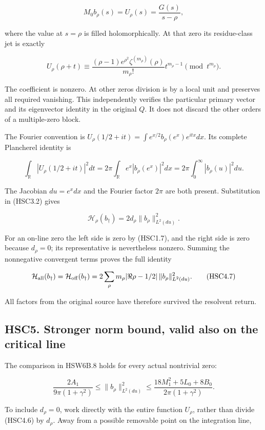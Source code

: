 \[
 M_0b_\rho(s)=U_\rho(s)=\frac{G(s)}{s-\rho},
\tag{HSC4.3}
\]

where the value at \(s=\rho\) is filled holomorphically. At that zero
its residue-class jet is exactly

\[
 U_\rho(\rho+t)\equiv
 \frac{(\rho-1)e^{\rho^2}\zeta^{(m_\rho)}(\rho)}{m_\rho!}
 t^{m_\rho-1}\pmod{t^{m_\rho}}.
\tag{HSC4.4}
\]

The coefficient is nonzero. At other zeros division is by a local unit
and preserves all required vanishing. This independently verifies the
particular primary vector and its eigenvector identity in the original
\(Q\). It does not discard the other orders of a multiple-zero block.

The Fourier convention is
\(U_\rho(1/2+it)=\int e^{x/2}b_\rho(e^x)e^{itx}dx\). Its complete
Plancherel identity is

\[
 \int_{\mathbb R}|U_\rho(1/2+it)|^2dt
 =2\pi\int_{\mathbb R}e^x|b_\rho(e^x)|^2dx
 =2\pi\int_0^\infty|b_\rho(u)|^2du.
\tag{HSC4.5}
\]

The Jacobian \(du=e^x dx\) and the Fourier factor \(2\pi\) are both
present. Substitution in (HSC3.2) gives

\[
 \mathcal H_\rho(b_\dagger)=2d_\rho\|b_\rho\|_{L^2(du)}^2.
\tag{HSC4.6}
\]

For an on-line zero the left side is zero by (HSC1.7), and the right
side is zero because \(d_\rho=0\); its representative is nevertheless
nonzero. Summing the nonnegative convergent terms proves the full
identity

\[
 \mathcal H_{\rm all}(b_\dagger)
 =\mathcal H_{\rm off}(b_\dagger)
 =2\sum_\rho m_\rho|\Re\rho-1/2|\,
 \|b_\rho\|_{L^2(du)}^2.
\tag{HSC4.7}
\]

All factors from the original source have therefore survived the
resolvent return.

\subsection{HSC5. Stronger norm bound, valid also on the critical
line}\label{hsc5.-stronger-norm-bound-valid-also-on-the-critical-line}

The comparison in HSW6B.8 holds for every actual nontrivial zero:

\[
 \boxed{
 \frac{2A_1}{9\pi(1+\gamma^2)}
 \le\|b_\rho\|_{L^2(du)}^2
 \le\frac{18M_1^2+5L_0+8B_0}{2\pi(1+\gamma^2)}.}
\tag{HSC5.1}
\]

To include \(d_\rho=0\), work directly with the entire function
\(U_\rho\), rather than divide (HSC4.6) by \(d_\rho\). Away from a
possible removable point on the integration line,

